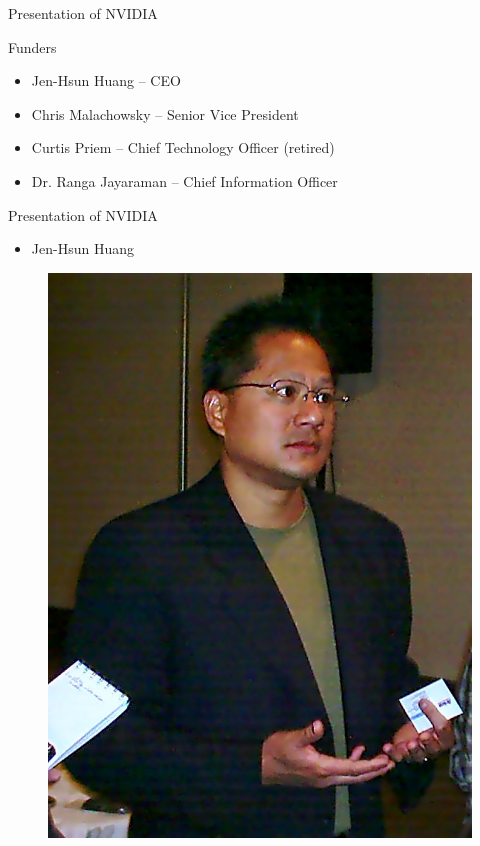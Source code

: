 \documentclass{beamer}
\begin{document}
\begin{frame}{Presentation of NVIDIA}
	\begin{block}{Funders}
		\begin{itemize}
			\item<+->{Jen-Hsun Huang -- CEO}
			\item<+->{Chris Malachowsky -- Senior Vice President}
			\item<+->{Curtis Priem -- Chief Technology Officer (retired)}
			\item<+->{Dr. Ranga Jayaraman -- Chief Information Officer}
		\end{itemize}
	\end{block}

\end{frame}

\begin{frame}{Presentation of NVIDIA}
	\transdissolve[duration=0.08]
	\begin{block}{}
		\begin{itemize}
			\item<+->{Jen-Hsun Huang}
		\end{itemize}
	\end{block}
	\begin{figure}[h]
		\includegraphics[width=0.50\textheight]{JensenHuang.jpg}
	\end{figure}
\end{frame}
\end{document}
